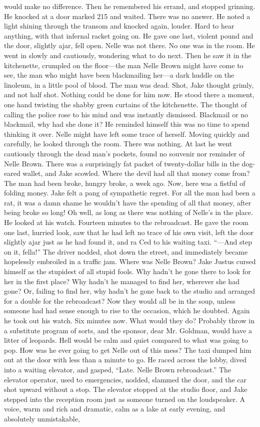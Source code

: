 \documentclass{novel}
\begin{document}
would make no difference. Then he remembered his errand, and stopped grinning. He knocked at a door marked 215 and waited. There was no answer. He noted a light shining through the transom and knocked again, louder. Hard to hear anything, with that infernal racket going on. He gave one last, violent pound and the door, slightly ajar, fell open. Nelle was not there. No one was in the room. He went in slowly and cautiously, wondering what to do next. Then he saw it in the kitchenette, crumpled on the floor—the man Nelle Brown might have come to see, the man who might have been blackmailing her—a dark huddle on the linoleum, in a little pool of blood. The man was dead. Shot, Jake thought grimly, and not half shot. Nothing could be done for him now. He stood there a moment, one hand twisting the shabby green curtains of the kitchenette. The thought of calling the police rose to his mind and was instantly dismissed. Blackmail or no blackmail, why had she done it? He reminded himself this was no time to spend thinking it over. Nelle might have left some trace of herself. Moving quickly and carefully, he looked through the room. There was nothing. At last he went cautiously through the dead man's pockets, found no souvenir nor reminder of Nelle Brown. There was a surprisingly fat packet of twenty-dollar bills in the dog-eared wallet, and Jake scowled. Where the devil had all that money come from? The man had been broke, hungry broke, a week ago. Now, here was a fistful of folding money. Jake felt a pang of sympathetic regret. For all the man had been a rat, it was a damn shame he wouldn't have the spending of all that money, after being broke so long! Oh well, as long as there was nothing of Nelle's in the place. He looked at his watch. Fourteen minutes to the rebroadcast. He gave the room one last, hurried look, saw that he had left no trace of his own visit, left the door slightly ajar just as he had found it, and ra Ced to his waiting taxi. “—And step on it, fella!” The driver nodded, shot down the street, and immediately became hopelessly embroiled in a traffic jam. Where was Nelle Brown? Jake Justus cursed himself as the stupidest of all stupid fools. Why hadn’t he gone there to look for her in the first place? Why hadn’t he managed to find her, wherever she had gone? Or, failing to find her, why hadn’t he gone back to the studio and arranged for a double for the rebroadcast? Now they would all be in the soup, unless someone had had sense enough to rise to the occasion, which he doubted. Again he took out his watch. Six minutes now. What would they do? Probably throw in a substitute program of sorts, and the sponsor, dear Mr. Goldman, would have a litter of leopards. Hell would be calm and quiet compared to what was going to pop. How was he ever going to get Nelle out of this mess? The taxi dumped him out at the door with less than a minute to go. He raced across the lobby, dived into a waiting elevator, and gasped, “Late. Nelle Brown rebroadcast.” The elevator operator, used to emergencies, nodded, slammed the door, and the car shot upward without a stop. The elevator stopped at the studio floor, and Jake stepped into the reception room just as someone turned on the loudspeaker. A voice, warm and rich and dramatic, calm as a lake at early evening, and absolutely unmistakable, 
\end{document}
